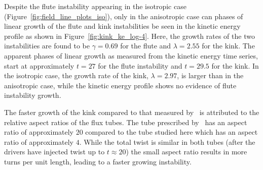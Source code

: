 \documentclass[fleqn,usenatbib]{mnras}
\newcommand{\rev}[1]{{\color{red} {#1}}}
\newcommand{\revcite}[1]{{\color{red} \underline{#1}}}
\begin{document}
Despite the flute instability appearing in the isotropic case
(Figure~\ref{fig:field_line_plots_iso}), only in the anisotropic case
can \rev{phases of linear growth of} the flute and kink instabilities be seen in the kinetic energy
profile as shown in Figure~\ref{fig:kink_ke_log-4}. Here, the growth
rates of the two instabilities are found to be $\gamma = 0.69$ for the flute
and $\lambda = 2.55$ for the kink. \rev{The apparent phases of linear
growth as measured from the kinetic energy time series, start} at approximately $t=27$ for
the flute instability and $t=29.5$ for the kink. In the isotropic case, the
growth rate of the kink, $\lambda = 2.97$, is larger than in the anisotropic
case, while the kinetic energy profile shows no evidence of flute instability growth. 

The faster growth of the kink compared to that measured by~\revcite{\citet{quinnEffectAnisotropicViscosity2020}} is attributed to the relative
aspect ratios of the flux tubes. The tube prescribed by~\revcite{\citet{quinnEffectAnisotropicViscosity2020}} has an aspect ratio of
approximately $20$ compared to the tube studied here which has an aspect ratio
of approximately $4$. While the total twist is similar in both tubes (after the
drivers have injected twist up to $t\approx20$) the small aspect ratio results
in more turns per unit length, leading to a faster growing instability. 
\end{document}
